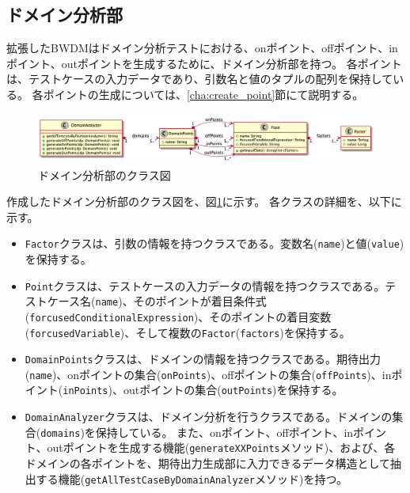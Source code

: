 \documentclass[uplatex, report, a4j, 10pt]{jsbook}
\newcommand\ttt[1]{\texttt{#1}}
\begin{document}
\subsection{ドメイン分析部}\label{cha:DomainAnalyzer}
拡張したBWDMはドメイン分析テストにおける、onポイント、offポイント、inポイント、outポイントを生成するために、ドメイン分析部を持つ。
各ポイントは、テストケースの入力データであり、引数名と値のタプルの配列を保持している。
各ポイントの生成については、\ref{cha:create_point}節にて説明する。

\begin{figure}[t]
  \begin{center}
    \includegraphics[keepaspectratio, width=160mm]{figs/DomainAnalyzer.png}
    \caption{ドメイン分析部のクラス図}
    \label{fig:class_DomainAnalyzer}
  \end{center}
\end{figure}

作成したドメイン分析部のクラス図を、図\ref{fig:class_DomainAnalyzer}に示す。
各クラスの詳細を、以下に示す。

\newcommand{\forcusedConditionalExpression}{\ttt{forcusedConditionalExpression}}

\begin{itemize}
  \item \ttt{Factor}クラスは、引数の情報を持つクラスである。変数名(\ttt{name})と値(\ttt{value})を保持する。
  \item \ttt{Point}クラスは、テストケースの入力データの情報を持つクラスである。テストケース名(\ttt{name})、そのポイントが着目条件式(\forcusedConditionalExpression{})、そのポイントの着目変数(\ttt{forcusedVariable})、そして複数の\ttt{Factor}(\ttt{factors})を保持する。
  \item \ttt{DomainPoints}クラスは、ドメインの情報を持つクラスである。期待出力(\ttt{name})、onポイントの集合(\ttt{onPoints})、offポイントの集合(\ttt{offPoints})、inポイント(\ttt{inPoints})、outポイントの集合(\ttt{outPoints})を保持する。
  \item \ttt{DomainAnalyzer}クラスは、ドメイン分析を行うクラスである。ドメインの集合(\ttt{domains})を保持している。
        また、onポイント、offポイント、inポイント、outポイントを生成する機能(\ttt{generateXXPoints}メソッド)、および、各ドメインの各ポイントを、期待出力生成部に入力できるデータ構造として抽出する機能(\ttt{getAllTestCaseByDomainAnalyzer}メソッド)を持つ。

\end{itemize}
\end{document}
